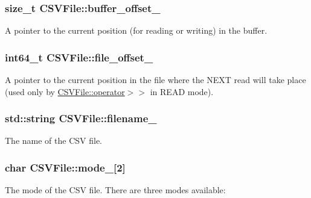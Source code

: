 \subsubsection[{buffer\+\_\+offset\+\_\+}]{\setlength{\rightskip}{0pt plus 5cm}size\+\_\+t C\+S\+V\+File\+::buffer\+\_\+offset\+\_\+\hspace{0.3cm}{\ttfamily [private]}}\label{classCSVFile_a485ee2abd3a0dcf762199402140a6feb}
A pointer to the current position (for reading or writing) in the buffer. \hypertarget{classCSVFile_ace9c6c4b16ce537550986d2cd10e431c}{}
\subsubsection[{file\+\_\+offset\+\_\+}]{\setlength{\rightskip}{0pt plus 5cm}int64\+\_\+t C\+S\+V\+File\+::file\+\_\+offset\+\_\+\hspace{0.3cm}{\ttfamily [private]}}\label{classCSVFile_ace9c6c4b16ce537550986d2cd10e431c}
A pointer to the current position in the file where the N\+E\+X\+T read will take place (used only by \hyperlink{classCSVFile_a8f703896ad1b5f08bdd1c23f0aade6b7}{C\+S\+V\+File\+::operator$>$$>$} in R\+E\+A\+D mode). \hypertarget{classCSVFile_a05fa932716ac239f4371dcaad11c644c}{}
\subsubsection[{filename\+\_\+}]{\setlength{\rightskip}{0pt plus 5cm}std\+::string C\+S\+V\+File\+::filename\+\_\+\hspace{0.3cm}{\ttfamily [private]}}\label{classCSVFile_a05fa932716ac239f4371dcaad11c644c}
The name of the C\+S\+V file. \hypertarget{classCSVFile_ab9642a99f708e948eef64cbfbf08be16}{}
\subsubsection[{mode\+\_\+}]{\setlength{\rightskip}{0pt plus 5cm}char C\+S\+V\+File\+::mode\+\_\+\mbox{[}2\mbox{]}\hspace{0.3cm}{\ttfamily [private]}}\label{classCSVFile_ab9642a99f708e948eef64cbfbf08be16}
The mode of the C\+S\+V file. There are three modes available\+:

